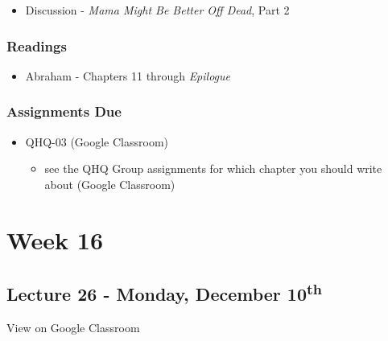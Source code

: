 \documentclass[]{book}
\providecommand{\tightlist}{%
  \setlength{\itemsep}{0pt}\setlength{\parskip}{0pt}}
\theoremstyle{definition}
\theoremstyle{definition}
\theoremstyle{definition}
\theoremstyle{remark}
\begin{document}
\begin{itemize}
\tightlist
\item
  Discussion - \emph{Mama Might Be Better Off Dead}, Part 2
\end{itemize}

\hypertarget{readings-27}{%
\subsubsection*{Readings}\label{readings-27}}

\begin{itemize}
\tightlist
\item
  Abraham - Chapters 11 through \emph{Epilogue}
\end{itemize}

\hypertarget{assignments-due-7}{%
\subsubsection*{Assignments Due}\label{assignments-due-7}}

\begin{itemize}
\tightlist
\item
  QHQ-03 (Google Classroom)

  \begin{itemize}
  \tightlist
  \item
    see the QHQ Group assignments for which chapter you should write
    about (Google Classroom)
  \end{itemize}
\end{itemize}

\hypertarget{week-16}{%
\section*{Week 16}\label{week-16}}

\hypertarget{lecture-26---monday-december-10th}{%
\subsection*{\texorpdfstring{Lecture 26 - Monday, December
10\textsuperscript{th}}{Lecture 26 - Monday, December 10th}}\label{lecture-26---monday-december-10th}}

View on Google Classroom
\end{document}
